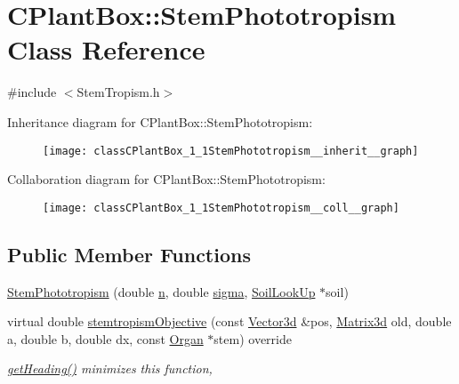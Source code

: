 \hypertarget{classCPlantBox_1_1StemPhototropism}{}\section{C\+Plant\+Box\+:\+:Stem\+Phototropism Class Reference}
\label{classCPlantBox_1_1StemPhototropism}


{\ttfamily \#include $<$Stem\+Tropism.\+h$>$}



Inheritance diagram for C\+Plant\+Box\+:\+:Stem\+Phototropism\+:\nopagebreak
\begin{figure}[H]
\begin{center}
\leavevmode
\texttt{[image: classCPlantBox\_1\_1StemPhototropism\_\_inherit\_\_graph]}
\end{center}
\end{figure}


Collaboration diagram for C\+Plant\+Box\+:\+:Stem\+Phototropism\+:\nopagebreak
\begin{figure}[H]
\begin{center}
\leavevmode
\texttt{[image: classCPlantBox\_1\_1StemPhototropism\_\_coll\_\_graph]}
\end{center}
\end{figure}
\subsection*{Public Member Functions}
\begin{DoxyCompactItemize}
\item 
\hyperlink{classCPlantBox_1_1StemPhototropism_a239ba8a1f21b0990812c7288bac46a9d}{Stem\+Phototropism} (double \hyperlink{classCPlantBox_1_1StemTropismFunction_a54ebffbb66feb026ce61d57f17d4d25a}{n}, double \hyperlink{classCPlantBox_1_1StemTropismFunction_a79ea448c44b07fb59d85e9d130190994}{sigma}, \hyperlink{classCPlantBox_1_1SoilLookUp}{Soil\+Look\+Up} $\ast$soil)
\item 
virtual double \hyperlink{classCPlantBox_1_1StemPhototropism_a41e742911835bb5b8dba8c8814d4a0f9}{stemtropism\+Objective} (const \hyperlink{classCPlantBox_1_1Vector3d}{Vector3d} \&pos, \hyperlink{classCPlantBox_1_1Matrix3d}{Matrix3d} old, double a, double b, double dx, const \hyperlink{classCPlantBox_1_1Organ}{Organ} $\ast$stem) override
\begin{DoxyCompactList}\small\item\em \hyperlink{classCPlantBox_1_1StemTropismFunction_ac72f7ad1200d1defbb3c9b20e20d1f62}{get\+Heading()} minimizes this function, \end{DoxyCompactList}\end{DoxyCompactItemize}

